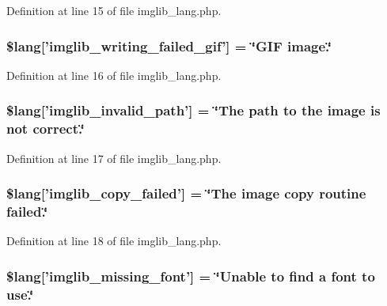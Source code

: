 Definition at line 15 of file imglib\-\_\-lang.\-php.

\hypertarget{imglib__lang_8php_a6169e9ed18d970dcc8965c4f195ae3e7}{
\subsubsection[{\$lang}]{\setlength{\rightskip}{0pt plus 5cm}\$lang\mbox{[}'imglib\-\_\-writing\-\_\-failed\-\_\-gif'\mbox{]} = \char`\"{}G\-I\-F image.\char`\"{}}}\label{imglib__lang_8php_a6169e9ed18d970dcc8965c4f195ae3e7}


Definition at line 16 of file imglib\-\_\-lang.\-php.

\hypertarget{imglib__lang_8php_a8ff486c25806a4731d1ffe20431df825}{
\subsubsection[{\$lang}]{\setlength{\rightskip}{0pt plus 5cm}\$lang\mbox{[}'imglib\-\_\-invalid\-\_\-path'\mbox{]} = \char`\"{}The path {\bf to} the image is {\bf not} correct.\char`\"{}}}\label{imglib__lang_8php_a8ff486c25806a4731d1ffe20431df825}


Definition at line 17 of file imglib\-\_\-lang.\-php.

\hypertarget{imglib__lang_8php_a9363000d2005b8276b39d581a11b562d}{
\subsubsection[{\$lang}]{\setlength{\rightskip}{0pt plus 5cm}\$lang\mbox{[}'imglib\-\_\-copy\-\_\-failed'\mbox{]} = \char`\"{}The image copy routine failed.\char`\"{}}}\label{imglib__lang_8php_a9363000d2005b8276b39d581a11b562d}


Definition at line 18 of file imglib\-\_\-lang.\-php.

\hypertarget{imglib__lang_8php_a935800aad2be18ca4fe99bb074674848}{
\subsubsection[{\$lang}]{\setlength{\rightskip}{0pt plus 5cm}\$lang\mbox{[}'imglib\-\_\-missing\-\_\-font'\mbox{]} = \char`\"{}Unable {\bf to} find {\bf a} font {\bf to} use.\char`\"{}}}\label{imglib__lang_8php_a935800aad2be18ca4fe99bb074674848}


